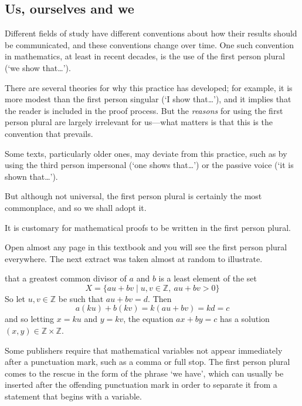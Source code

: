 \subsection*{Us, ourselves and we}

Different fields of study have different conventions about how their results should be communicated, and these conventions change over time. One such convention in mathematics, at least in recent decades, is the use of the first person plural (`we show that\dots{}').

There are several theories for why this practice has developed; for example, it is more modest than the first person singular (`I show that\dots{}'), and it implies that the reader is included in the proof process. But the \textit{reasons} for using the first person plural are largely irrelevant for us---what matters is that this is the convention that prevails.

Some texts, particularly older ones, may deviate from this practice, such as by using the third person impersonal (`one shows that\dots{}') or the passive voice (`it is shown that\dots{}').

But although not universal, the first person plural is certainly the most commonplace, and so we shall adopt it.

\begin{writingprinciple}
\label{wpFirstPersonPlural}
It is customary for mathematical proofs to be written in the first person plural.
\end{writingprinciple}

Open almost any page in this textbook and you will see the first person plural everywhere. The next extract was taken almost at random to illustrate.

\begin{extract}
  that a greatest common divisor of $a$ and $b$ is a least element of the set
\[ X = \{ au+bv \mid u,v \in \mathbb{Z},\ au+bv > 0 \} \]
So let $u,v \in \mathbb{Z}$ be such that $au+bv=d$. Then
\[ a(ku) + b(kv) = k(au+bv) = kd = c \]
and so letting $x=ku$ and $y=kv$,  the equation $ax+by=c$ has a solution $(x,y) \in \mathbb{Z} \times \mathbb{Z}$.
\end{extract}

Some publishers require that mathematical variables not appear immediately after a punctuation mark, such as a comma or full stop. The first person plural comes to the rescue in the form of the phrase `we have', which can usually be inserted after the offending punctuation mark in order to separate it from a statement that begins with a variable.

